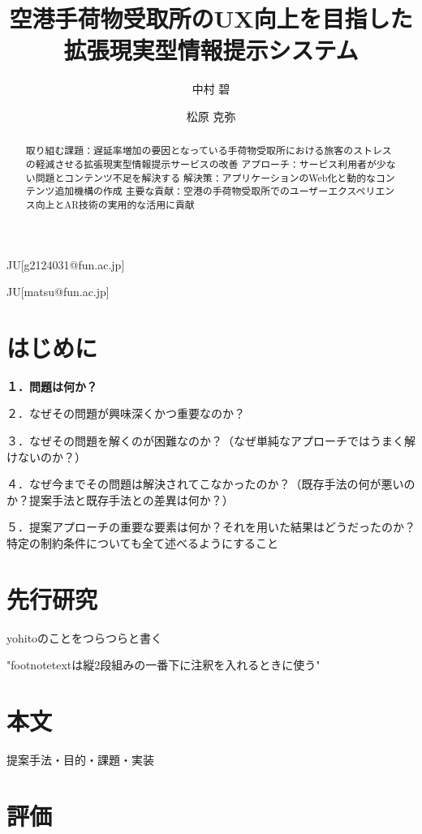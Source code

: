 \documentclass[submit,techrep]{ipsj}
\begin{document}
\title{空港手荷物受取所のUX向上を目指した拡張現実型情報提示システム}



\author{中村 碧}{}{JU}[g2124031@fun.ac.jp]
\author{松原 克弥}{}{JU}[matsu@fun.ac.jp]

\begin{abstract}
取り組む課題：遅延率増加の要因となっている手荷物受取所における旅客のストレスの軽減させる拡張現実型情報提示サービスの改善
アプローチ：サービス利用者が少ない問題とコンテンツ不足を解決する
解決策：アプリケーションのWeb化と動的なコンテンツ追加機構の作成
主要な貢献：空港の手荷物受取所でのユーザーエクスペリエンス向上とAR技術の実用的な活用に貢献
\end{abstract}

\maketitle

\section{はじめに}

{\bf
１．問題は何か？

２．なぜその問題が興味深くかつ重要なのか？

３．なぜその問題を解くのが困難なのか？（なぜ単純なアプローチではうまく解けないのか？）

４．なぜ今までその問題は解決されてこなかったのか？（既存手法の何が悪いのか？提案手法と既存手法との差異は何か？）

５．提案アプローチの重要な要素は何か？それを用いた結果はどうだったのか？特定の制約条件についても全て述べるようにすること

}

\section{先行研究}
yohitoのことをつらつらと書く


"footnotetextは縦2段組みの一番下に注釈を入れるときに使う"


\section{本文}
提案手法・目的・課題・実装

\section{評価}
\end{document}
